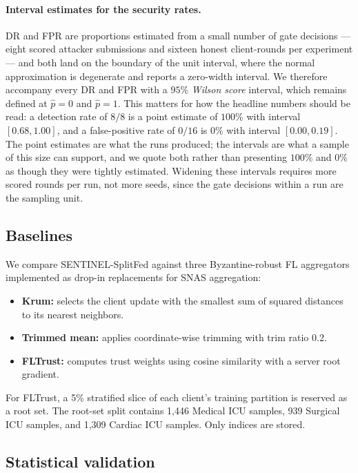 \documentclass[pdflatex,sn-mathphys-num]{sn-jnl}
\begin{document}
\paragraph{Interval estimates for the security rates.} DR and FPR are proportions estimated from a small number of gate decisions --- eight scored attacker submissions and sixteen honest client-rounds per experiment --- and both land on the boundary of the unit interval, where the normal approximation is degenerate and reports a zero-width interval. We therefore accompany every DR and FPR with a $95\%$ \emph{Wilson score} interval, which remains defined at $\hat{p}=0$ and $\hat{p}=1$. This matters for how the headline numbers should be read: a detection rate of $8/8$ is a point estimate of $100\%$ with interval $[0.68, 1.00]$, and a false-positive rate of $0/16$ is $0\%$ with interval $[0.00, 0.19]$. The point estimates are what the runs produced; the intervals are what a sample of this size can support, and we quote both rather than presenting $100\%$ and $0\%$ as though they were tightly estimated. Widening these intervals requires more scored rounds per run, not more seeds, since the gate decisions within a run are the sampling unit.

\subsection{Baselines}

We compare SENTINEL-SplitFed against three Byzantine-robust FL aggregators implemented as drop-in replacements for SNAS aggregation:
\begin{itemize}
    \item \textbf{Krum:} selects the client update with the smallest sum of squared distances to its nearest neighbors.
    \item \textbf{Trimmed mean:} applies coordinate-wise trimming with trim ratio 0.2.
    \item \textbf{FLTrust:} computes trust weights using cosine similarity with a server root gradient.
\end{itemize}
For FLTrust, a 5\% stratified slice of each client's training partition is reserved as a root set. The root-set split contains 1,446 Medical ICU samples, 939 Surgical ICU samples, and 1,309 Cardiac ICU samples. Only indices are stored.

\subsection{Statistical validation}
\end{document}
